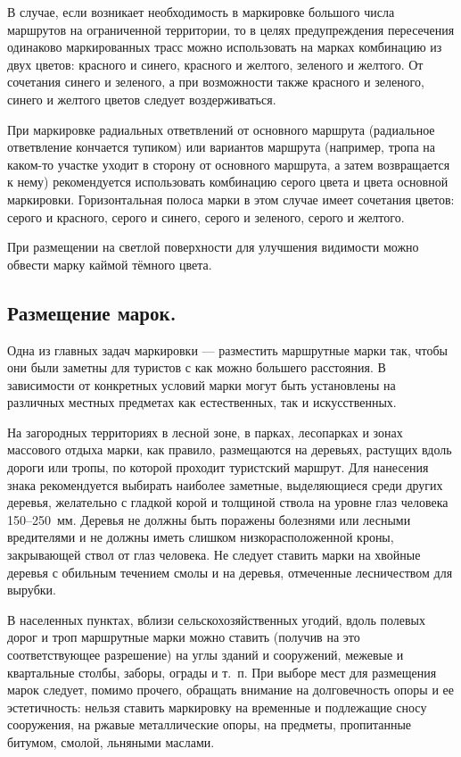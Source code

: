 \documentclass[a4paper,12pt]{extarticle}
\begin{document}
В случае, если возникает необходимость в маркировке большого числа маршрутов на ограниченной территории, то в целях
предупреждения пересечения одинаково маркированных трасс можно использовать на марках комбинацию из двух цветов:
красного и синего, красного и желтого, зеленого и желтого. От сочетания синего и зеленого, а при возможности
также красного и зеленого, синего и желтого цветов следует воздерживаться.

При маркировке радиальных ответвлений от основного маршрута (радиальное ответвление кончается тупиком) или вариантов
маршрута (например, тропа на каком-то участке уходит в сторону от основного маршрута, а затем возвращается к нему)
рекомендуется использовать комбинацию серого цвета и цвета основной маркировки. Горизонтальная полоса  марки в этом
случае имеет сочетания цветов: серого и красного, серого и синего, серого и зеленого, серого и желтого.

При размещении на светлой поверхности для улучшения видимости можно обвести марку каймой тёмного цвета.

\subsection{Размещение марок.}

Одна из главных задач маркировки --- разместить маршрутные марки так, чтобы они были заметны для туристов с как можно
большего расстояния. В зависимости от конкретных условий марки могут быть установлены на различных местных предметах как
естественных, так и искусственных.

На загородных территориях в лесной зоне, в парках,
лесопарках и зонах массового отдыха марки, как правило, размещаются на деревьях, растущих вдоль дороги или тропы, по
которой проходит туристский маршрут. Для нанесения знака рекомендуется выбирать наиболее заметные, выделяющиеся среди
других деревья, желательно с гладкой корой и толщиной ствола на уровне глаз человека 150--250~мм. Деревья не должны быть
поражены болезнями или лесными вредителями и не должны иметь слишком низкорасположенной кроны, закрывающей ствол от глаз
человека. Не следует ставить марки на хвойные деревья с обильным течением смолы и на деревья, отмеченные лесничеством
для вырубки.

В населенных пунктах, вблизи сельскохозяйственных угодий, вдоль полевых дорог и троп маршрутные марки можно ставить
(получив на это соответствующее разрешение) на углы зданий и сооружений, межевые и квартальные столбы, заборы, ограды и
т.~п. При выборе мест для размещения марок следует, помимо прочего, обращать внимание на долговечность опоры и ее
эстетичность: нельзя ставить маркировку на временные и подлежащие сносу сооружения, на ржавые металлические опоры, на
предметы, пропитанные битумом, смолой, льняными маслами.
\end{document}
